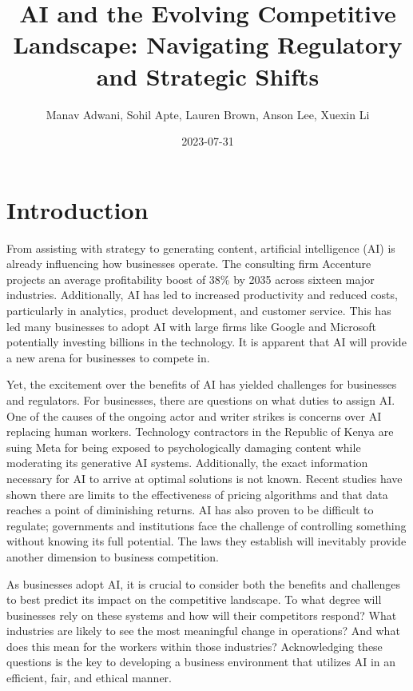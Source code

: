 \documentclass[
]{book}
\title{AI and the Evolving Competitive Landscape: Navigating Regulatory and Strategic Shifts}
\author{Manav Adwani, Sohil Apte, Lauren Brown, Anson Lee, Xuexin Li}
\date{2023-07-31}
\begin{document}
\maketitle

{
\setcounter{tocdepth}{1}
\tableofcontents
}
\hypertarget{introduction}{%
\chapter{Introduction}\label{introduction}}

From assisting with strategy to generating content, artificial intelligence (AI) is already influencing how businesses operate. The consulting firm Accenture projects an average profitability boost of 38\% by 2035 across sixteen major industries. Additionally, AI has led to increased productivity and reduced costs, particularly in analytics, product development, and customer service. This has led many businesses to adopt AI with large firms like Google and Microsoft potentially investing billions in the technology. It is apparent that AI will provide a new arena for businesses to compete in.

Yet, the excitement over the benefits of AI has yielded challenges for businesses and regulators. For businesses, there are questions on what duties to assign AI. One of the causes of the ongoing actor and writer strikes is concerns over AI replacing human workers. Technology contractors in the Republic of Kenya are suing Meta for being exposed to psychologically damaging content while moderating its generative AI systems. Additionally, the exact information necessary for AI to arrive at optimal solutions is not known. Recent studies have shown there are limits to the effectiveness of pricing algorithms and that data reaches a point of diminishing returns. AI has also proven to be difficult to regulate; governments and institutions face the challenge of controlling something without knowing its full potential. The laws they establish will inevitably provide another dimension to business competition.

As businesses adopt AI, it is crucial to consider both the benefits and challenges to best predict its impact on the competitive landscape. To what degree will businesses rely on these systems and how will their competitors respond? What industries are likely to see the most meaningful change in operations? And what does this mean for the workers within those industries? Acknowledging these questions is the key to developing a business environment that utilizes AI in an efficient, fair, and ethical manner.
\end{document}
